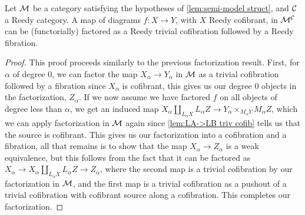 \documentclass{amsart}
\begin{document}
\begin{prop}\label{prop:factor tc/f}
    Let $\mathcal{M}$ be a category satisfying the hypotheses of \ref{lem:semi-model struct}, and $\mathcal{C}$ a Reedy category. A map of diagrams $f:X\to Y$, with $X$ Reedy cofibrant, in $\mathcal{M}^{\mathcal{C}}$ can be (functorially) factored as a Reedy trivial cofibration followed by a Reedy fibration.
\end{prop}
\begin{proof}
    This proof proceeds similarly to the previous factorization result. First, for $\alpha$ of degree 0, we can factor the map $X_\alpha\to Y_\alpha$ in $\mathcal{M}$ as a trivial cofibration followed by a fibration since $X_\alpha$ is cofibrant, this gives us our degree 0 objects in the factorization, $Z_\alpha$. If we now assume we have factored $f$ on all objects of degree less than $\alpha$, we get an induced map $X_\alpha\coprod_{L_\alpha X}L_\alpha Z\to Y_\alpha\times_{M_\alpha Y}M_\alpha Z$, which we can apply factorization in $\mathcal{M}$ again since \ref{lem:LA->LB triv cofib} tells us that the source is cofibrant. This gives us our factorization into a cofibration and a fibration, all that remains is to show that the map $X_\alpha\to Z_\alpha$ is a weak equivalence, but this follows from the fact that it can be factored as $X_\alpha\to X_\alpha\coprod_{L_\alpha X}L_\alpha Z\to Z_\alpha$, where the second map is a trivial cofibration by our factorization in $\mathcal{M}$, and the first map is a trivial cofibration as a pushout of a trivial cofibration with cofibrant source along a cofibration. This completes our factorization.
\end{proof}
\end{document}
